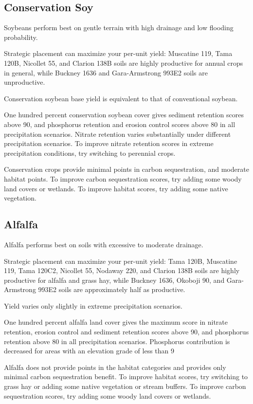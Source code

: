 \documentclass[11pt]{article}
\begin{document}
\subsection{Conservation Soy}

Soybeans perform best on gentle terrain with high drainage and low flooding probability. 

Strategic placement can maximize your per-unit yield: Muscatine 119, Tama 120B, Nicollet 55, and Clarion 138B soils are highly productive for annual crops in general, while Buckney 1636 and Gara-Armstrong 993E2 soils are unproductive.

Conservation soybean base yield is equivalent to that of conventional soybean.

One hundred percent conservation soybean cover gives sediment retention scores above 90, and phosphorus retention and erosion control scores above 80 in all precipitation scenarios. Nitrate retention varies substantially under different precipitation scenarios. To improve nitrate retention scores in extreme precipitation conditions, try switching to perennial crops.

Conservation crops provide minimal points in carbon sequestration, and moderate habitat points. To improve carbon sequestration scores, try adding some woody land covers or wetlands. To improve habitat scores, try adding some native vegetation.

\subsection{Alfalfa}

Alfalfa performs best on soils with excessive to moderate drainage.

Strategic placement can maximize your per-unit yield: Tama 120B, Muscatine 119, Tama 120C2, Nicollet 55, Nodaway 220, and Clarion 138B soils are highly productive for alfalfa and grass hay, while Buckney 1636, Okoboji 90, and Gara-Armstrong 993E2 soils are approximately half as productive.

Yield varies only slightly in extreme precipitation scenarios. 

One hundred percent alfalfa land cover gives the maximum score in nitrate retention, erosion control and sediment retention scores above 90, and phosphorus retention above 80 in all precipitation scenarios. Phosphorus contribution is decreased for areas with an elevation grade of less than 9%

Alfalfa does not provide points in the habitat categories and provides only minimal carbon sequestration benefit. To improve habitat scores, try switching to grass hay or adding some native vegetation or stream buffers. To improve carbon sequestration scores, try adding some woody land covers or wetlands.
\end{document}
